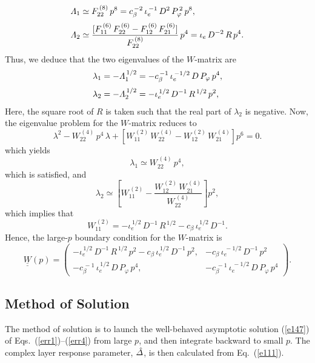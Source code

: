 \documentclass[12pt,prb,aps]{revtex4-1}
\begin{document}
 \begin{align}
 {\mit\Lambda}_1&\simeq F_{22}^{\,(8)}\,p^8=  c_\beta^{\,-2}\,\iota_e^{\,-1}\,D^2\,P_\varphi^{\,2}\,p^8,\\[0.5ex]
 {\mit\Lambda}_2 &\simeq \frac{[F_{11}^{\,(6)}\,F_{22}^{\,(6)} - F_{12}^{\,(6)}\,F_{21}^{\,(6)}]}{F_{22}^{\,(8)}}\,p^4= \iota_e\,D^{-2}\,R\,p^4.
 \end{align}
 Thus, we deduce that the two eigenvalues of the $W$-matrix are 
 \begin{align}
 \lambda_1&=-{\mit\Lambda}_1^{\,1/2}= -c_\beta^{\,-1}\,\iota_e^{\,-1/2}\,D\,P_\varphi\,p^4,\\[0.5ex]
 \lambda_2&=-{\mit\Lambda}_2^{\,1/2}=-\iota_e^{\,1/2}\,D^{-1}\,R^{\,1/2}\,p^2,
 \end{align}
 Here, the square root of $R$ is taken such that the real part of $\lambda_2$ is negative. 
  Now, the eigenvalue problem for the $W$-matrix reduces to 
 \begin{equation}
 \lambda^{2} - W_{22}^{\,(4)}\,p^4\,\lambda + \left[W_{11}^{\,(2)}\,W_{22}^{\,(4)} - W_{12}^{\,(2)}\,W_{21}^{\,(4)}\right]p^6 = 0.
 \end{equation}
which yields
\begin{equation}
\lambda_1\simeq W_{22}^{\,(4)}\,p^4,
\end{equation}
which is satisfied, and
\begin{equation}
\lambda_2 \simeq \left[W_{11}^{\,(2)} - \frac{W_{12}^{\,(2)}\,W_{21}^{\,(4)}}{W_{22}^{\,(4)}}\right]p^2,
\end{equation}
 which implies that
 \begin{equation}
 W_{11}^{\,(2)} = -\iota_e^{\,1/2}\,D^{-1}\,R^{\,1/2}-c_\beta\,\iota_e^{\,1/2}\,D^{-1}.
 \end{equation}
 Hence, the large-$p$ boundary condition for the $W$-matrix
 is
 \begin{equation}\label{e147}
 \underline{\underline{W}}(p) =  \left(\begin{array}{cc} -\iota_e^{\,1/2}\,D^{-1}\,R^{\,1/2}\,p^2-c_\beta\,\iota_e^{\,1/2}\,D^{-1}\,p^2,& - c_\beta\,\iota_e^{\,-1/2}\,D^{-1}\,p^2\\-c_\beta^{\,-1}\,\iota_e^{\,1/2}\,D\,P_\varphi\,p^4,&-c_\beta^{\,-1}\,\iota_e^{\,-1/2}\,D\,P_\varphi\,p^4\end{array}\right).
 \end{equation}

\subsection{Method of Solution}
The method of solution is to launch the well-behaved asymptotic solution (\ref{e147}) of Eqs.~(\ref{err1})--(\ref{err4}) from large $p$, and then
integrate backward to small $p$. The complex layer response parameter, $\hat{\mit\Delta}$, is then calculated from Eq.~(\ref{e111}). 
\end{document}
